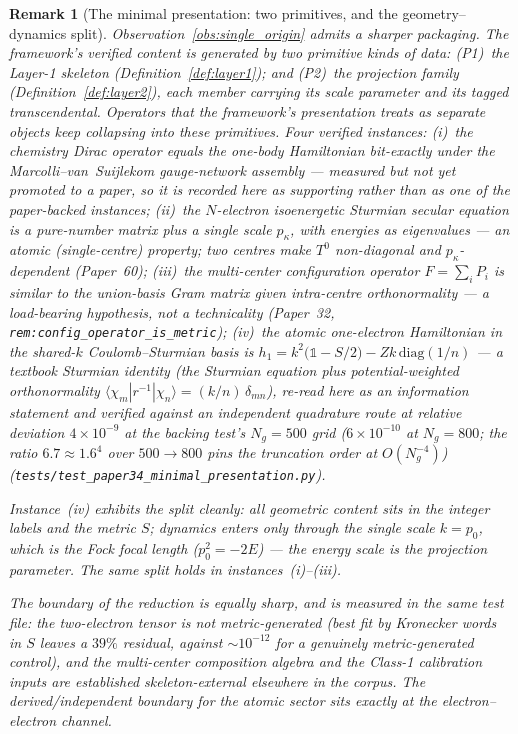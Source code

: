 \documentclass[11pt]{article}
\newtheorem{remark}{Remark}
\begin{document}
\begin{remark}[The minimal presentation: two primitives, and the
geometry--dynamics split]
\label{rem:minimal_presentation}
Observation~\ref{obs:single_origin} admits a sharper packaging.  The
framework's verified content is generated by \emph{two} primitive
kinds of data: (P1)~the Layer-1 skeleton (Definition~\ref{def:layer1});
and (P2)~the projection family (Definition~\ref{def:layer2}), each
member carrying its scale parameter and its tagged transcendental.
Operators that the framework's presentation treats as separate
objects keep collapsing into these primitives.  Four verified
instances:
(i)~the chemistry Dirac operator equals the one-body Hamiltonian
bit-exactly under the Marcolli--van~Suijlekom gauge-network
assembly --- \emph{measured but not yet promoted to a paper}, so it is
recorded here as supporting rather than as one of the paper-backed
instances;
(ii)~the $N$-electron isoenergetic Sturmian secular equation is a
pure-number matrix plus a single scale $p_\kappa$, with energies as
eigenvalues --- an \emph{atomic (single-centre)} property; two centres
make $T^0$ non-diagonal and $p_\kappa$-dependent (Paper~60);
(iii)~the multi-center configuration operator $F=\sum_i P_i$ is
similar to the union-basis Gram matrix \emph{given intra-centre
orthonormality} --- a load-bearing hypothesis, not a technicality
(Paper~32, \texttt{rem:config\_operator\_is\_metric});
(iv)~the atomic one-electron Hamiltonian in the shared-$k$
Coulomb--Sturmian basis is
$h_1 = k^2\bigl(\mathbb{1} - S/2\bigr) - Zk\,\mathrm{diag}(1/n)$
--- a textbook Sturmian identity (the Sturmian equation plus
potential-weighted orthonormality
$\langle\chi_m|r^{-1}|\chi_n\rangle = (k/n)\,\delta_{mn}$), re-read
here as an information statement and verified against an
independent quadrature route at relative deviation
$4\times10^{-9}$ at the backing test's $N_g = 500$ grid
($6\times10^{-10}$ at $N_g = 800$; the ratio $6.7 \approx 1.6^4$
over $500\to800$ pins the truncation order at $O(N_g^{-4})$)
(\texttt{tests/test\_paper34\_minimal\_presentation.py}).

Instance~(iv) exhibits the split cleanly: \emph{all geometric
content sits in the integer labels and the metric $S$; dynamics
enters only through the single scale} $k = p_0$, which is the Fock
focal length ($p_0^2 = -2E$) --- the energy scale \emph{is} the
projection parameter.  The same split holds in
instances~(i)--(iii).

The boundary of the reduction is equally sharp, and is measured in
the same test file: the two-electron tensor is \emph{not}
metric-generated (best fit by Kronecker words in $S$ leaves a
$39\%$ residual, against $\sim\!10^{-12}$ for a genuinely
metric-generated control), and the multi-center composition algebra
and the Class-1 calibration inputs are established
skeleton-external elsewhere in the corpus.  The derived/independent
boundary for the atomic sector sits exactly at the
electron--electron channel.


\end{remark}
\end{document}
